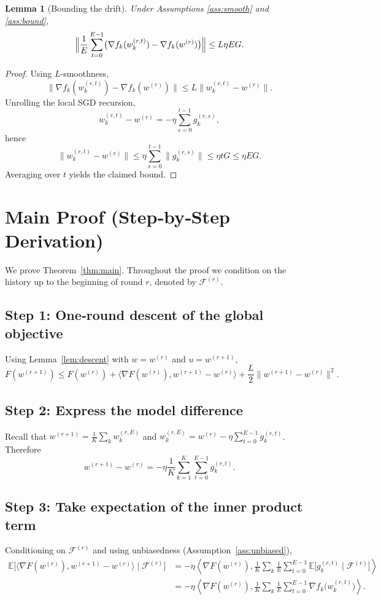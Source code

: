 \documentclass{article}
\newtheorem{lemma}{Lemma}
\newcommand{\E}{\mathbb{E}}
\begin{document}
\begin{lemma}[Bounding the drift]\label{lem:drift}
Under Assumptions \ref{ass:smooth} and \ref{ass:bound},
\[
\Bigl\|\frac{1}{E}\sum_{t=0}^{E-1}
\bigl(\nabla f_k(w_{k}^{(r,t)})-\nabla f_k(w^{(r)})\bigr)\Bigr\|
\le L\eta E G .
\]
\end{lemma}
\begin{proof}
Using $L$‑smoothness,
\[
\|\nabla f_k(w_{k}^{(r,t)})-\nabla f_k(w^{(r)})\|
\le L\|w_{k}^{(r,t)}-w^{(r)}\|.
\]
Unrolling the local SGD recursion,
\[
w_{k}^{(r,t)}-w^{(r)}
= -\eta\sum_{s=0}^{t-1} g_{k}^{(r,s)},
\]
hence
\[
\|w_{k}^{(r,t)}-w^{(r)}\|
\le \eta\sum_{s=0}^{t-1}\|g_{k}^{(r,s)}\|
\le \eta t G\le \eta E G .
\]
Averaging over $t$ yields the claimed bound. \hfill\qedhere
\end{proof}

\section*{Main Proof (Step‑by‑Step Derivation)}
We prove Theorem~\ref{thm:main}.  Throughout the proof we condition on the
history up to the beginning of round $r$, denoted by $\mathcal{F}^{(r)}$.

\subsection*{Step 1: One‑round descent of the global objective}
Using Lemma~\ref{lem:descent} with $w = w^{(r)}$ and $u = w^{(r+1)}$,
\[
F(w^{(r+1)})\le F(w^{(r)})+\bigl\langle\nabla F(w^{(r)}),w^{(r+1)}-w^{(r)}\bigr\rangle
+\frac{L}{2}\|w^{(r+1)}-w^{(r)}\|^2 .
\tag{1}
\label{eq:descent}
\]

\subsection*{Step 2: Express the model difference}
Recall that $w^{(r+1)} = \frac{1}{K}\sum_{k} w_{k}^{(r,E)}$ and
$w_{k}^{(r,E)} = w^{(r)} -\eta\sum_{t=0}^{E-1} g_{k}^{(r,t)}$.  Therefore
\[
w^{(r+1)}-w^{(r)} = -\eta\frac{1}{K}\sum_{k=1}^{K}\sum_{t=0}^{E-1} g_{k}^{(r,t)} .
\tag{2}
\label{eq:diff}
\]

\subsection*{Step 3: Take expectation of the inner product term}
Conditioning on $\mathcal{F}^{(r)}$ and using unbiasedness (Assumption~\ref{ass:unbiased}),
\[
\begin{aligned}
\E\!\bigl[\langle\nabla F(w^{(r)}),w^{(r+1)}-w^{(r)}\rangle\mid\mathcal{F}^{(r)}\bigr]
&= -\eta\!\left\langle\nabla F(w^{(r)}),
      \frac{1}{K}\sum_{k}\frac{1}{E}\sum_{t=0}^{E-1}
      \E\!\bigl[g_{k}^{(r,t)}\mid\mathcal{F}^{(r)}\bigr]\right\rangle \\
&= -\eta\!\left\langle\nabla F(w^{(r)}),
      \frac{1}{K}\sum_{k}\frac{1}{E}\sum_{t=0}^{E-1}
      \nabla f_k\!\bigl(w_{k}^{(r,t)}\bigr)\right\rangle .
\end{aligned}
\tag{3}
\label{eq:inner}
\]
\end{document}
